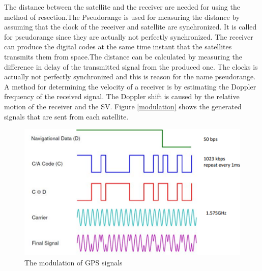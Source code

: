  The distance between the satellite and the receiver are needed for using the method of resection.The Pseudorange is used for measuring the distance by assuming that the clock of the receiver and satellite are synchronized. It is called for pseudorange since they are actually not perfectly synchronized. The receiver can produce the digital codes at the same time instant that the satellites transmits them from space.The distance can be calculated by measuring the difference in delay of the transmitted signal from the produced one. The clocks is actually not perfectly synchronized and this is reason for the name pseudorange. \\
 A method for determining the velocity of a receiver is by estimating the Doppler frequency of the received signal. The Doppler shift is caused by the relative motion of the receiver and the SV. Figure \ref{modulation} shows the generated signals that are sent from each satellite. 
 
 \begin{figure}[H]
\centering
\includegraphics[width=16 cm]{Project_Report/Images/code_data.png}
\caption{The modulation of GPS signals}
\label{fig:modulation}
\end{figure}

 
 
